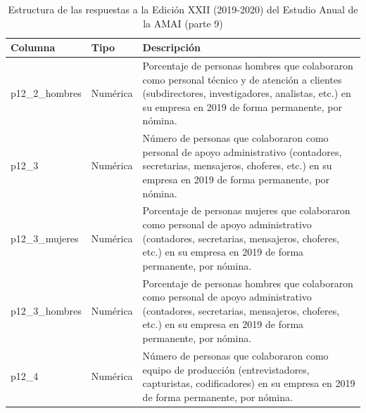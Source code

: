 \begin{table}[]
\caption{Estructura de las respuestas a la Edición XXII (2019-2020) del Estudio Anual de la AMAI (parte 9)}
\label{tab:raw2019_9}
\begin{tabular}{|l|l|l|}
\hline
Columna &
  Tipo &
  Descripción \\ \hline
p12\_2\_hombres &
  Numérica &
  \parbox[t]{8cm}{Porcentaje de personas hombres que colaboraron como personal técnico y de atención a clientes (subdirectores, investigadores, analistas, etc.) en su empresa en 2019 de forma permanente, por nómina.\vspace{0.1cm}} \\ \hline
p12\_3 &
  Numérica &
  \parbox[t]{8cm}{Número de personas que colaboraron como personal de apoyo administrativo (contadores, secretarias, mensajeros, choferes, etc.) en su empresa en 2019 de forma permanente, por nómina.\vspace{0.1cm}} \\ \hline
p12\_3\_mujeres &
  Numérica &
  \parbox[t]{8cm}{Porcentaje de personas mujeres que colaboraron como personal de apoyo administrativo (contadores, secretarias, mensajeros, choferes, etc.)  en su empresa en 2019 de forma permanente, por nómina.\vspace{0.1cm}} \\ \hline
p12\_3\_hombres &
  Numérica &
  \parbox[t]{8cm}{Porcentaje de personas hombres que colaboraron como personal de apoyo administrativo (contadores, secretarias, mensajeros, choferes, etc.) en su empresa en 2019 de forma permanente, por nómina.\vspace{0.1cm}} \\ \hline
p12\_4 &
  Numérica &
  \parbox[t]{8cm}{Número de personas que colaboraron como equipo de producción (entrevistadores, capturistas, codificadores) en su empresa en 2019 de forma permanente, por nómina.\vspace{0.1cm}} \\ \hline
\end{tabular}
\end{table}


